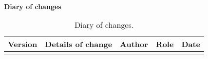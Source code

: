 \textbf{\Large Diary of changes}
\vspace{0.5cm}
\small
\begin{longtable}{|c|m{4cm}|>{\centering}m{2.7cm}|c|c|}
\hline 
\textbf{Version} & \textbf{Details of change} & \textbf{Author} & \textbf{Role} & \textbf{Date}\\ \hline \endhead

\caption{Diary of changes.}
\label{tabella:diarioModifiche}
\end{longtable}
\clearpage
